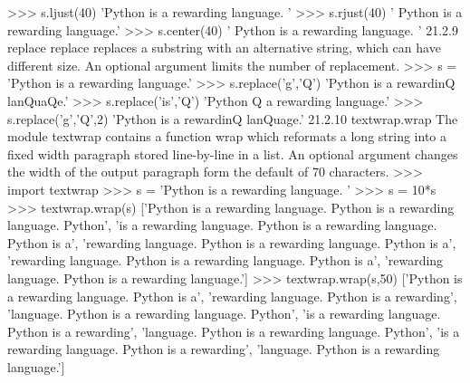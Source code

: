 >>> s.ljust(40)
’Python is a rewarding language. ’
>>> s.rjust(40)
’ Python is a rewarding language.’
>>> s.center(40)
’ Python is a rewarding language. ’
21.2.9 replace
replace replaces a substring with an alternative string, which can have different size. An optional argument
limits the number of replacement.
>>> s = ’Python is a rewarding language.’
>>> s.replace(’g’,’Q’)
’Python is a rewardinQ lanQuaQe.’
>>> s.replace(’is’,’Q’)
’Python Q a rewarding language.’
>>> s.replace(’g’,’Q’,2)
’Python is a rewardinQ lanQuage.’
21.2.10 textwrap.wrap
The module textwrap contains a function wrap which reformats a long string into a fixed width paragraph
stored line-by-line in a list. An optional argument changes the width of the output paragraph form the
default of 70 characters.
>>> import textwrap
>>> s = ’Python is a rewarding language. ’
>>> s = 10*s
>>> textwrap.wrap(s)
[’Python is a rewarding language. Python is a rewarding language. Python’,
’is a rewarding language. Python is a rewarding language. Python is a’,
’rewarding language. Python is a rewarding language. Python is a’,
’rewarding language. Python is a rewarding language. Python is a’,
’rewarding language. Python is a rewarding language.’]
>>> textwrap.wrap(s,50)
[’Python is a rewarding language. Python is a’,
’rewarding language. Python is a rewarding’,
’language. Python is a rewarding language. Python’,
’is a rewarding language. Python is a rewarding’,
’language. Python is a rewarding language. Python’,
’is a rewarding language. Python is a rewarding’,
’language. Python is a rewarding language.’]

